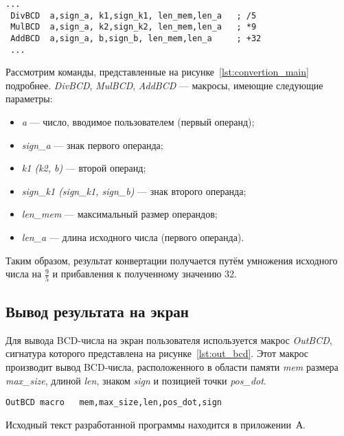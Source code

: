 \begin{lstlisting}[caption={Последовательность конвертации с
    использованием макроподстановок в языке Ассемблер},
  label=lst:convertion_main,language={[x86masm]Assembler},basicstyle=\scriptsize\ttfamily]
 ...
 DivBCD  a,sign_a, k1,sign_k1, len_mem,len_a   ; /5
 MulBCD  a,sign_a, k2,sign_k2, len_mem,len_a   ; *9
 AddBCD  a,sign_a, b,sign_b, len_mem,len_a     ; +32
 ...
\end{lstlisting}

Рассмотрим команды, представленные на рисунке~\ref{lst:convertion_main} подробнее.
\textit{DivBCD}, \textit{MulBCD}, \textit{AddBCD} --- макросы, имеющие следующие параметры:
\begin{itemize}
  \item \textit{a} --- число, вводимое пользователем (первый операнд);
  \item \textit{sign\_a} --- знак первого операнда;
  \item \textit{k1 (k2, b)} --- второй операнд;
  \item \textit{sign\_k1 (sign\_k1, sign\_b)} ---  знак второго операнда;
  \item \textit{len\_mem} --- максимальный размер операндов;
  \item \textit{len\_a} --- длина исходного числа (первого операнда).
\end{itemize}

Таким образом, результат конвертации получается путём умножения
исходного числа на $\frac{9}{5}$ и прибавления к полученному значению 32.

\subsection{Вывод результата на экран}

Для вывода BCD-числа на экран пользователя используется 
макрос \textit{OutBCD}, сигнатура которого представлена на рисунке~\ref{lst:out_bcd}.
Этот макрос производит вывод BCD-числа, расположенного
в области памяти \textit{mem} размера \textit{max\_size},
длиной \textit{len}, знаком \textit{sign} и позицией точки \textit{pos\_dot}.

\begin{lstlisting}[caption={Сигнатура макроса вывода BCD-числа на экран пользователя},
label=lst:out_bcd,language={[x86masm]Assembler}]
 OutBCD	macro	mem,max_size,len,pos_dot,sign
\end{lstlisting}

Исходный текст разработанной программы находится в приложении~А.
